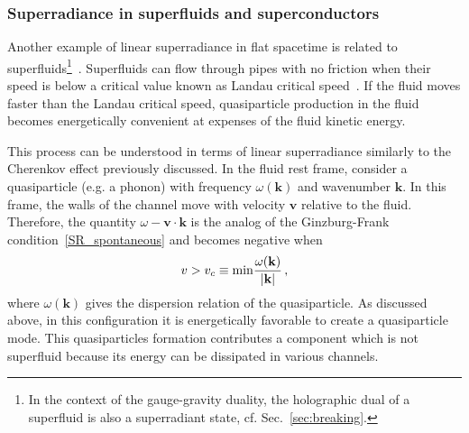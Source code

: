 \documentclass[11pt]{article}
\numberwithin{equation}{section} %
\begin{document}
\subsubsection{Superradiance in superfluids and superconductors\label{sec:superfluid}}
Another example of linear superradiance in flat spacetime is related to superfluids\footnote{In the context of the gauge-gravity duality, the holographic dual of a superfluid is also a superradiant state, cf. Sec.~\ref{sec:breaking}.}~\cite{Bekenstein:1998nt}. Superfluids can flow through pipes with no friction when their speed is below a critical value known as Landau critical speed~\cite{Landau:Statistical}. If the fluid moves faster than the Landau critical speed, quasiparticle production in the fluid becomes energetically convenient at expenses of the fluid kinetic energy.

This process can be understood in terms of linear superradiance similarly to the Cherenkov effect previously discussed. In the fluid rest frame, consider a quasiparticle (e.g. a phonon) with frequency $\omega(\mathbf{k})$ and wavenumber $\mathbf{k}$. In this frame, the walls of the channel move with velocity $\mathbf{v}$ relative to the fluid. Therefore, the quantity
$\omega-\mathbf{v}\cdot\mathbf{k}$ is the analog of the Ginzburg-Frank condition~\eqref{SR_spontaneous} and becomes negative when 
\begin{equation}\label{landau_vel}
 v>v_c\equiv {\rm min}\frac{\omega(\mathbf{k})}{|\mathbf{k}|}\,,
\end{equation}
where $\omega(\mathbf{k})$ gives the dispersion relation of the quasiparticle. As discussed above, in this configuration it is energetically favorable to create a quasiparticle mode. This quasiparticles formation contributes a component which is not superfluid because its energy can be dissipated in various channels.
\end{document}
